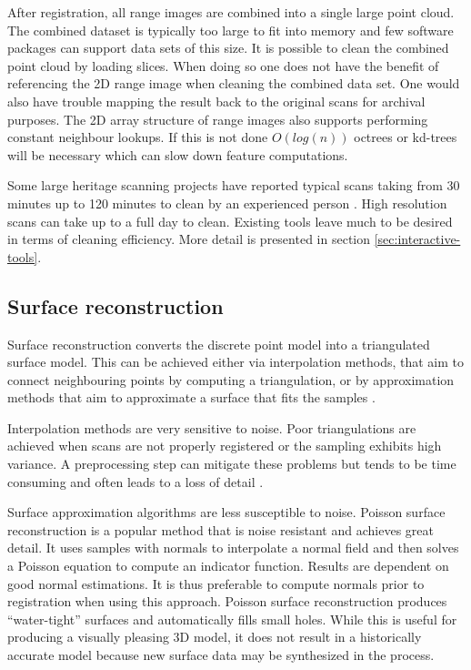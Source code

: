 After registration, all range images are combined into a single large point cloud. The combined dataset is typically too large to fit into memory and few software packages can support data sets of this size. It is possible to clean the combined point cloud by loading slices. When doing so one does not have the benefit of referencing the 2D range image when cleaning the combined data set. One would also have trouble mapping the result back to the original scans for archival purposes. The 2D array structure of range images also supports performing constant neighbour lookups. If this is not done $O(log(n))$ octrees or kd-trees will be necessary which can slow down feature computations.

Some large heritage scanning projects have reported typical scans taking from 30 minutes up to 120 minutes to clean by an experienced person \cite{Ruther2011}. High resolution scans can take up to a full day to clean. Existing tools leave much to be desired in terms of cleaning efficiency. More detail is presented in section \ref{sec:interactive-tools}.

\subsection{Surface reconstruction}  \label{sec:reconstruction}


Surface reconstruction converts the discrete point model into a triangulated surface model. This can be achieved either via interpolation methods, that aim to connect neighbouring points by computing a triangulation, or by approximation methods that aim to approximate a surface that fits the samples \cite{Schall2005}.

Interpolation methods are very sensitive to noise. Poor triangulations are achieved when scans are not properly registered or the sampling exhibits high variance. A preprocessing step can mitigate these problems but tends to be time consuming and often leads to a loss of detail \cite{Ruther2011}.

Surface approximation algorithms are less susceptible to noise. Poisson surface reconstruction \cite{Kazhdan2006} is a popular method that is noise resistant and achieves great detail. It uses samples with normals to interpolate a normal field and then solves a Poisson equation to compute an indicator function. Results are dependent on good normal estimations. It is thus preferable to compute normals prior to registration when using this approach. Poisson surface reconstruction produces ``water-tight'' surfaces and automatically fills small holes. While this is useful for producing a visually pleasing 3D model, it does not result in a historically accurate model because new surface data may be synthesized in the process.

